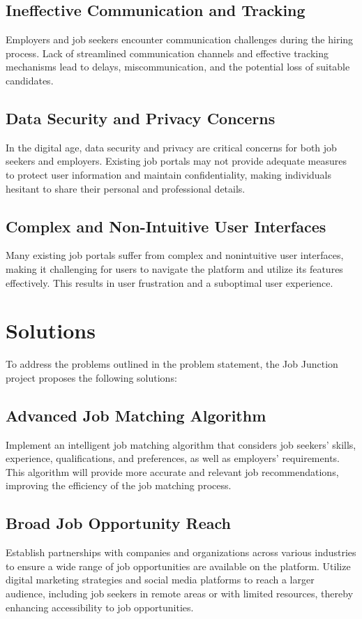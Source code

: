 \documentclass[a4paper,11pt]{report}
\begin{document}
\section{Ineffective Communication and Tracking}
Employers and job seekers encounter communication
challenges during the hiring process. Lack of streamlined communication channels and effective tracking
mechanisms lead to delays, miscommunication, and the potential loss of suitable candidates.

\section{Data Security and Privacy Concerns}
In the digital age, data security and privacy are critical concerns
for both job seekers and employers. Existing job portals may not provide adequate measures to protect
user information and maintain confidentiality, making individuals hesitant to share their personal and
professional details.
\section{Complex and Non-Intuitive User Interfaces}
Many existing job portals suffer from complex and nonintuitive user interfaces, making it challenging for users to navigate the platform and utilize its features
effectively. This results in user frustration and a suboptimal user experience.

\chapter{Solutions}
To address the problems outlined in the problem statement, the Job Junction project proposes the
following solutions:

\section{Advanced Job Matching Algorithm}
 Implement an intelligent job matching algorithm that considers
job seekers' skills, experience, qualifications, and preferences, as well as employers' requirements. This
algorithm will provide more accurate and relevant job recommendations, improving the efficiency of the
job matching process.

\section{Broad Job Opportunity Reach}
 Establish partnerships with companies and organizations across various
industries to ensure a wide range of job opportunities are available on the platform. Utilize digital
marketing strategies and social media platforms to reach a larger audience, including job seekers in
remote areas or with limited resources, thereby enhancing accessibility to job opportunities.
\end{document}
